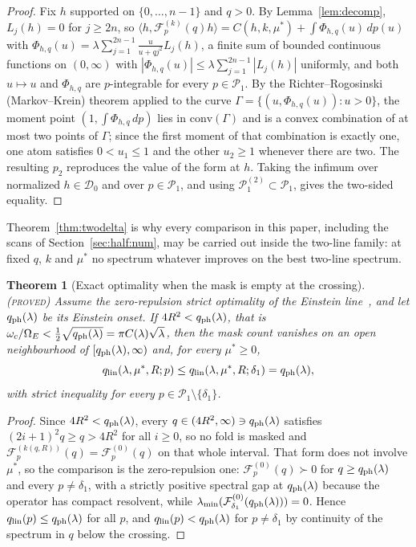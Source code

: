 \documentclass[11pt]{article}
\newcommand{\OmE}{\Omega_E}
\newcommand{\Fcal}{\mathcal F}
\newcommand{\muS}{\mu^{*}}
\newtheorem{theorem}{Theorem}[section]
\theoremstyle{definition}
\theoremstyle{remark}
\newcommand{\proved}{\textnormal{\textsc{(proved)}}}
\begin{document}
\begin{proof}
Fix $h$ supported on $\{0,\dots,n-1\}$ and $q>0$. By Lemma~\ref{lem:decomp},
$L_j(h)=0$ for $j\ge2n$, so
$\langle h,\Fcal_p^{(k)}(q)h\rangle=C(h,k,\muS)+\int\Phi_{h,q}(u)\,dp(u)$ with
$\Phi_{h,q}(u)=\lambda\sum_{j=1}^{2n-1}\frac{u}{u+qj^2}L_j(h)$, a finite sum of bounded
continuous functions on $(0,\infty)$ with
$|\Phi_{h,q}(u)|\le\lambda\sum_{j=1}^{2n-1}|L_j(h)|$ uniformly, and both $u\mapsto u$ and
$\Phi_{h,q}$ are $p$-integrable for every $p\in\mathcal P_1$. By the
Richter--Rogosinski (Markov--Krein) theorem applied to the curve
$\Gamma=\{(u,\Phi_{h,q}(u)):u>0\}$, the moment point
$(1,\int\Phi_{h,q}\,dp)$ lies in $\mathrm{conv}(\Gamma)$ and is a convex combination of at
most two points of $\Gamma$; since the first moment of that combination is exactly one,
one atom satisfies $0<u_1\le1$ and the other $u_2\ge1$ whenever there are two. The
resulting $p_2$ reproduces the value of the form at $h$. Taking the infimum over
normalized $h\in\mathcal D_0$ and over $p\in\mathcal P_1$, and using
$\mathcal P_1^{(2)}\subset\mathcal P_1$, gives the two-sided equality.
\end{proof}

Theorem~\ref{thm:twodelta} is why every comparison in this paper, including the scans of
Section~\ref{sec:half:num}, may be carried out inside the two-line family: at fixed $q$,
$k$ and $\muS$ no spectrum whatever improves on the best two-line spectrum.

\begin{theorem}[Exact optimality when the mask is empty at the crossing]
\label{thm:nomask}\proved
Assume the zero-repulsion strict optimality of the Einstein line~\cite{rens,kondratev}, and
let $q_{\rm ph}(\lambda)$ be its Einstein onset. If $4R^2<q_{\rm ph}(\lambda)$, that is
$\omega_c/\OmE<\tfrac12\sqrt{q_{\rm ph}(\lambda)}=\pi C(\lambda)\sqrt\lambda$, then the
mask count vanishes on an open neighbourhood of $[q_{\rm ph}(\lambda),\infty)$ and, for
every $\muS\ge0$,
\[
q_{\rm lin}(\lambda,\muS,R;p)\le q_{\rm lin}(\lambda,\muS,R;\delta_1)
=q_{\rm ph}(\lambda),
\]
with strict inequality for every $p\in\mathcal P_1\setminus\{\delta_1\}$.
\end{theorem}

\begin{proof}
Since $4R^2<q_{\rm ph}(\lambda)$, every $q\in(4R^2,\infty)\ni q_{\rm ph}(\lambda)$
satisfies $(2i+1)^2q\ge q>4R^2$ for all $i\ge0$, so no fold is masked and
$\Fcal_p^{(k(q,R))}(q)=\Fcal_p^{(0)}(q)$ on that whole interval. That form does not involve
$\muS$, so the comparison is the zero-repulsion one: $\Fcal_p^{(0)}(q)\succ0$ for
$q\ge q_{\rm ph}(\lambda)$ and every $p\ne\delta_1$, with a strictly positive spectral gap
at $q_{\rm ph}(\lambda)$ because the operator has compact resolvent, while
$\lambda_{\min}(\Fcal_{\delta_1}^{(0)}(q_{\rm ph}(\lambda)))=0$. Hence
$q_{\rm lin}(p)\le q_{\rm ph}(\lambda)$ for all $p$, and $q_{\rm lin}(p)<q_{\rm ph}(\lambda)$
for $p\ne\delta_1$ by continuity of the spectrum in $q$ below the crossing.
\end{proof}
\end{document}
